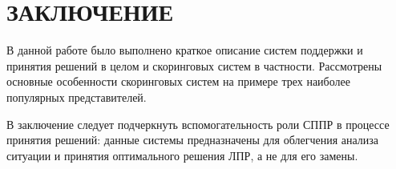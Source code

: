 \section*{ЗАКЛЮЧЕНИЕ}

В данной работе было выполнено краткое описание систем поддержки и принятия решений
в целом и скоринговых систем в частности.
Рассмотрены основные особенности скоринговых систем
на примере трех наиболее популярных представителей.

В заключение следует подчеркнуть вспомогательность роли СППР в процессе принятия решений:
данные системы предназначены для облегчения анализа ситуации и принятия оптимального решения ЛПР,
а не для его замены.